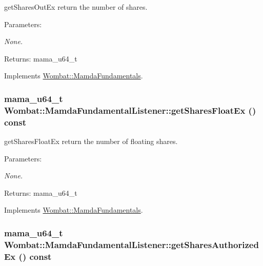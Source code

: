 get\-Shares\-Out\-Ex return the number of shares. 

\begin{Desc}
\item[Parameters:]
\begin{description}
\item[{\em None.}]\end{description}
\end{Desc}
\begin{Desc}
\item[Returns:]mama\_\-u64\_\-t \end{Desc}


Implements \hyperlink{classWombat_1_1MamdaFundamentals_f4229948e3f79b0cc686985243a14749}{Wombat::Mamda\-Fundamentals}.\hypertarget{classWombat_1_1MamdaFundamentalListener_c37c3fa41884972b67e1abbabeddb9f5}{
\subsubsection[getSharesFloatEx]{\setlength{\rightskip}{0pt plus 5cm}mama\_\-u64\_\-t Wombat::Mamda\-Fundamental\-Listener::get\-Shares\-Float\-Ex () const}}
\label{classWombat_1_1MamdaFundamentalListener_c37c3fa41884972b67e1abbabeddb9f5}


get\-Shares\-Float\-Ex return the number of floating shares. 

\begin{Desc}
\item[Parameters:]
\begin{description}
\item[{\em None.}]\end{description}
\end{Desc}
\begin{Desc}
\item[Returns:]mama\_\-u64\_\-t \end{Desc}


Implements \hyperlink{classWombat_1_1MamdaFundamentals_9fad5ad5bb06171cccd8e9b5a6633793}{Wombat::Mamda\-Fundamentals}.\hypertarget{classWombat_1_1MamdaFundamentalListener_338972a5c68467e1464b62b59ef19af7}{
\subsubsection[getSharesAuthorizedEx]{\setlength{\rightskip}{0pt plus 5cm}mama\_\-u64\_\-t Wombat::Mamda\-Fundamental\-Listener::get\-Shares\-Authorized\-Ex () const}}
\label{classWombat_1_1MamdaFundamentalListener_338972a5c68467e1464b62b59ef19af7}


